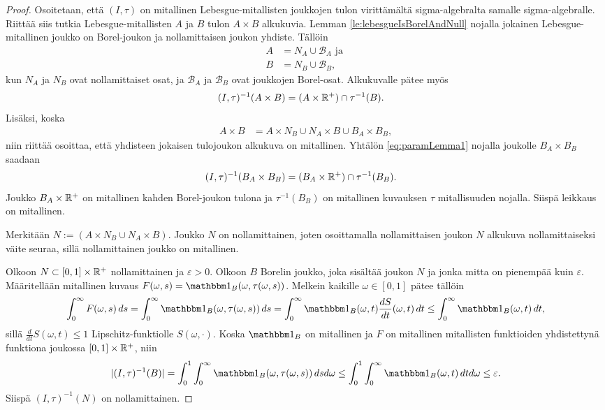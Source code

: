 \documentclass[12pt,oneside,a4paper]{amsbook} %
\begin{document}
\begin{proof}
    Osoitetaan, että $(I, \tau)$ on mitallinen Lebesgue-mitallisten joukkojen tulon virittämältä sigma-algebralta samalle sigma-algebralle. Riittää siis tutkia Lebesgue-mitallisten $A$ ja $B$ tulon $A \times B$ alkukuvia. Lemman \ref{le:lebesgueIsBorelAndNull} nojalla jokainen Lebesgue-mitallinen joukko on Borel-joukon ja nollamittaisen joukon yhdiste. Tällöin
    \begin{align*}
        A &= N_A \cup \mathcal{B}_A \text{ ja } \\
        B &= N_B \cup \mathcal{B}_B,
    \end{align*}
    kun $N_A$ ja $N_B$ ovat nollamittaiset osat, ja $\mathcal{B}_A$ ja $\mathcal{B}_B$ ovat joukkojen Borel-osat. Alkukuvalle pätee myös
    \begin{align}\label{eq:paramLemma1}
        (I, \tau)^{-1}(A\times B) &= (A \times {\mathbb{R}^{+}}) \cap \tau^{-1}(B).
    \end{align}
    Lisäksi, koska 
    \begin{align}
        A \times B &= A \times N_B \cup N_A \times B \cup B_A \times B_B,
    \end{align}
    niin riittää osoittaa, että yhdisteen jokaisen tulojoukon alkukuva on mitallinen. Yhtälön \eqref{eq:paramLemma1} nojalla joukolle $B_A \times B_B$ saadaan
    \begin{align*}
        (I, \tau)^{-1}(B_A\times B_B) &= (B_A \times {\mathbb{R}^{+}}) \cap \tau^{-1}(B_B).
    \end{align*}
    Joukko $B_A \times {\mathbb{R}^{+}}$ on mitallinen kahden Borel-joukon tulona ja $\tau^{-1}(B_B)$ on mitallinen kuvauksen $\tau$ mitallisuuden nojalla. Siispä leikkaus on mitallinen.
    
    Merkitään $N:= (A \times N_B \cup N_A \times B)$. Joukko $N$ on nollamittainen, joten osoittamalla nollamittaisen joukon $N$ alkukuva nollamittaiseksi väite seuraa, sillä nollamittainen joukko on mitallinen.
    
    Olkoon $N \subset [0, 1] \times {\mathbb{R}^{+}}$ nollamittainen ja $\varepsilon > 0$. Olkoon $B$ Borelin joukko, joka sisältää joukon $N$ ja jonka mitta on pienempää kuin $\varepsilon$. Määritellään mitallinen kuvaus $F(\omega, s) = \indfct{B}(\omega, \tau(\omega, s))$. Melkein kaikille $\omega \in [0,1]$ pätee tällöin
    \begin{align}
        \int_0^\infty F(\omega, s) \, ds = \int_0^\infty \indfct{B}(\omega, \tau(\omega, s))\, ds = \int_0^\infty \indfct{B}(\omega, t)\frac{d S}{d t}(\omega, t) \, dt \le \int_0^\infty \indfct{B}(\omega, t)\, dt,
    \end{align}
    sillä $\frac{d}{dt}S(\omega, t)\le 1$ Lipschitz-funktiolle $S(\omega, \cdot)$. Koska $\indfct{B}$ on mitallinen ja $F$ on mitallinen mitallisten funktioiden yhdistettynä funktiona joukossa $[0, 1] \times {\mathbb{R}^{+}}$, niin
    \begin{align*}
        |(I, \tau)^{-1}(B)| = \int_0^1\int_0^\infty \indfct{B}(\omega, \tau(\omega, s)) \, dsd\omega \le \int_0^1\int_0^\infty \indfct{B}(\omega, t) \, dtd\omega \le \varepsilon.
    \end{align*}
Siispä $(I, \tau)^{-1}(N)$ on nollamittainen.
\end{proof}
\end{document}
